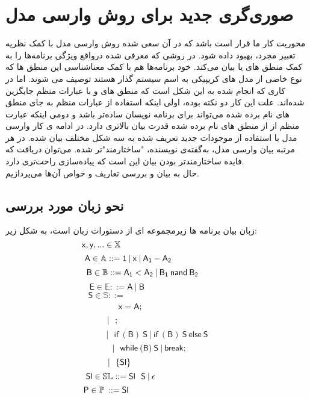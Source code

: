 
\chapter{صوری‌گری جدید برای روش وارسی مدل}

محوریت کار ما قرار است\cite{calcul} باشد که در آن سعی شده روش وارسی مدل با کمک نظریه تعبیر مجرد، بهبود داده شود. در\cite{clarke} روشی که معرفی شده در‌واقع ویژگی برنامه‌ها را به کمک منطق های  یا  بیان می‌کند. خود برنامه‌ها هم با کمک معناشناسی این منطق ها که نوع خاصی از مدل های کریپیکی به اسم سیستم گذار هستند توصیف می شوند. اما در\cite{calcul} کاری که انجام شده به این شکل است که منطق های  و  با عبارات منظم\cite{kleene56} جایگزین شده‌اند. علت این کار دو نکته بوده، اولی اینکه استفاده از عبارات منظم به جای منطق های نام برده شده می‌تواند برای برنامه نویسان ساده‌تر باشد و دومی اینکه عبارت منظم از از منطق های نام برده شده قدرت بیان بالاتری دارد.\cite{regisbetter} در ادامه ی کار وارسی مدل با استفاده از موجودات جدید تعریف شده به سه شکل مختلف بیان شده. در هر مرتبه بیان وارسی مدل، به‌گفته‌ی نویسنده، "ساختارمند"تر شده. می‌توان دریافت که فایده ساختارمندتر بودن بیان این است که پیاده‌سازی راحت‌تری دارد.\\
حال به بیان و بررسی تعاریف و خواص آن‌ها می‌پردازیم.

\section{نحو زبان مورد بررسی‬}

زبان بیان برنامه ها زیرمجموعه ای از دستورات زبان  است، به شکل زیر:
$$\mathsf{x,y},... \in \mathbb{X}\hspace{4.65cm}$$
$$\mathsf{A} \in \mathbb{A} ::=\mathsf{1\:|\:x\:|\:A_1 - A_2\hspace{2.4cm}}$$  
$$\mathsf{B \in \mathbb{B} ::=A_1<A_2 \:|\: B_1 \: nand\: B_2\hspace{1.2cm}}$$
$$\mathsf{E \in \mathbb{E}::= A \: | \: B\hspace{4cm}}$$
$$\mathsf{S\in \mathbb{S} ::=\hspace{5cm}  }$$
$$\mathsf{x=A; \hspace{2.25cm}}$$
$$\mathsf{|\:\:\:;\hspace{3.75cm}}$$
$$\mathsf{|\:\:\:if\:(B)\:S\:|\:if\:(B)\:S\:else\:S}$$
$$\mathsf{|\:\:\:while\:(B)\:S\: | \: break;\hspace{0.65cm}}$$
$$\mathsf{|\:\:\:\{Sl\}\hspace{3.15cm}}$$
$$\mathsf{Sl \in \mathbb{SL}::=Sl\:\:\:S\:|\:\epsilon}\hspace{3.05cm}$$
$$\mathsf{P\in \mathbb{P}\:::=Sl}\hspace{4.25cm}$$

